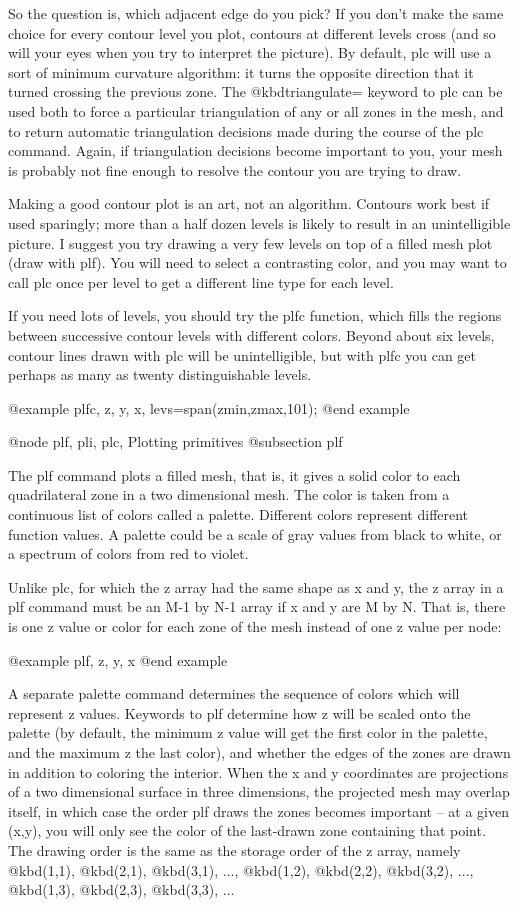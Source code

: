 So the question is, which adjacent edge do you pick?  If you don't
make the same choice for every contour level you plot, contours at
different levels cross (and so will your eyes when you try to
interpret the picture).  By default, plc will use a sort of minimum
curvature algorithm: it turns the opposite direction that it turned
crossing the previous zone.  The @kbd{triangulate=} keyword to plc can be
used both to force a particular triangulation of any or all zones in
the mesh, and to return automatic triangulation decisions made during
the course of the plc command.  Again, if triangulation decisions
become important to you, your mesh is probably not fine enough to
resolve the contour you are trying to draw.

Making a good contour plot is an art, not an algorithm.  Contours work
best if used sparingly; more than a half dozen levels is likely to
result in an unintelligible picture.  I suggest you try drawing a very
few levels on top of a filled mesh plot (draw with plf).  You will need
to select a contrasting color, and you may want to call plc once per
level to get a different line type for each level.

If you need lots of levels, you should try the plfc function, which
fills the regions between successive contour levels with different
colors.  Beyond about six levels, contour lines drawn with plc will be
unintelligible, but with plfc you can get perhaps as many as twenty
distinguishable levels.

@example
plfc, z, y, x, levs=span(zmin,zmax,101);
@end example

@node plf, pli, plc, Plotting primitives
@subsection plf

The plf command plots a filled mesh, that is, it gives a solid color
to each quadrilateral zone in a two dimensional mesh.  The color is
taken from a continuous list of colors called a palette.  Different
colors represent different function values.  A palette could be a
scale of gray values from black to white, or a spectrum of colors from
red to violet.

Unlike plc, for which the z array had the same shape as x and y, the z
array in a plf command must be an M-1 by N-1 array if x and y are M by
N.  That is, there is one z value or color for each zone of the mesh
instead of one z value per node:

@example
plf, z, y, x
@end example

A separate palette command determines the sequence of colors which will
represent z values.  Keywords to plf determine how z will be scaled onto
the palette (by default, the minimum z value will get the first color in
the palette, and the maximum z the last color), and whether the edges of
the zones are drawn in addition to coloring the interior.  When the x
and y coordinates are projections of a two dimensional surface in three
dimensions, the projected mesh may overlap itself, in which case the
order plf draws the zones becomes important -- at a given (x,y), you
will only see the color of the last-drawn zone containing that point.
The drawing order is the same as the storage order of the z array,
namely @kbd{(1,1)}, @kbd{(2,1)}, @kbd{(3,1)}, ..., @kbd{(1,2)},
@kbd{(2,2)}, @kbd{(3,2)}, ..., @kbd{(1,3)}, @kbd{(2,3)}, @kbd{(3,3)},
...

